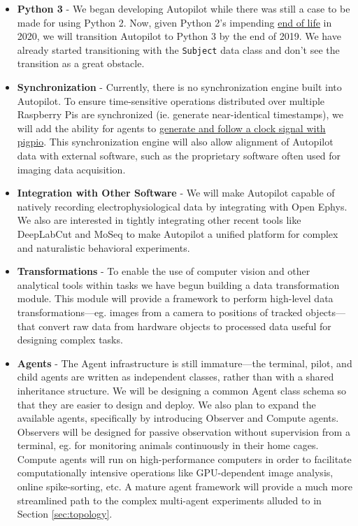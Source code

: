 \begin{fullwidth}
\begin{itemize}
    \item \textbf{Python 3} - We began developing Autopilot while there was still a case to be made for using Python 2. Now, given Python 2's impending \href{https://www.python.org/dev/peps/pep-0373/#update}{end of life} in 2020, we will transition Autopilot to Python 3 by the end of 2019. We have already started transitioning with the \texttt{Subject} data class and don't see the transition as a great obstacle.
    \item \textbf{Synchronization} - Currently, there is no synchronization engine built into Autopilot. To ensure time-sensitive operations distributed over multiple Raspberry Pis are synchronized (ie. generate near-identical timestamps), we will add the ability for agents to \href{http://abyz.me.uk/rpi/pigpio/python.html#hardware_clock}{generate and follow a clock signal with pigpio}. This synchronization engine will also allow alignment of Autopilot data with external software, such as the proprietary software often used for imaging data acquisition.
    \item \label{item:othertools} \textbf{Integration with Other Software} - We will make Autopilot capable of natively recording electrophysiological data by integrating with Open Ephys\citep{siegleOpenEphysOpensource2017}. We also are interested in tightly integrating other recent tools like DeepLabCut\citep{nathUsingDeepLabCut3D2019} and MoSeq\citep{wiltschkoMappingSubSecondStructure2015} to make Autopilot a unified platform for complex and naturalistic behavioral experiments.
    \item \textbf{Transformations} - To enable the use of computer vision and other analytical tools within tasks we have begun building a data transformation module. This module will provide a framework to perform high-level data transformations---eg. images from a camera to positions of tracked objects---that convert raw data from hardware objects to processed data useful for designing complex tasks.
    \item \textbf{Agents}\label{sec:futureagents} - The Agent infrastructure is still immature---the terminal, pilot, and child agents are written as independent classes, rather than with a shared inheritance structure. We will be designing a common Agent class schema so that they are easier to design and deploy. We also plan to expand the available agents, specifically by introducing Observer and Compute agents. Observers will be designed for passive observation without supervision from a terminal, eg. for monitoring animals continuously in their home cages. Compute agents will run on high-performance computers in order to facilitate computationally intensive operations like GPU-dependent image analysis, online spike-sorting, etc. A mature agent framework will provide a much more streamlined path to the complex multi-agent experiments alluded to in Section \ref{sec:topology}.

\end{itemize}
\end{fullwidth}
